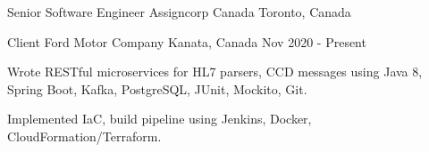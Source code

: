 

\begin{cventries}

  \cventry
  {Senior Software Engineer} %
  {Assigncorp Canada} %
  {Toronto, Canada} %
  
  {Client } %
  {Ford Motor Company} %
  {Kanata, Canada} %
  {Nov 2020 - Present} %
  {
    \begin{cvitems}
      \item {Wrote RESTful microservices for HL7 parsers, CCD messages using Java 8, Spring Boot, Kafka, PostgreSQL, JUnit, Mockito, Git.}
      \item {Implemented IaC, build pipeline using Jenkins, Docker, CloudFormation/Terraform.}
    \end{cvitems}
  }


\end{cventries}
